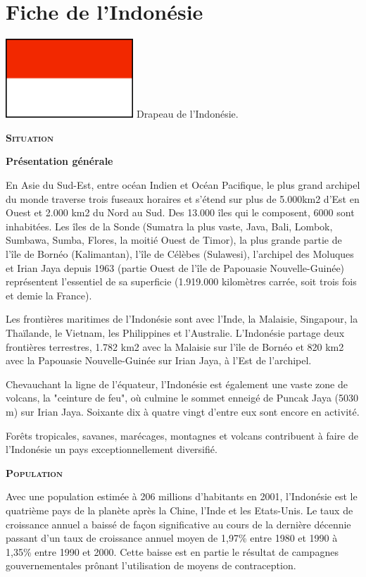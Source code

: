 \section{Fiche de l'Indonésie}

\hspace*{-0.65cm}
\includegraphics[width=4.8cm]{articles/Fiche-de-l-indonesie/drapeauindonesie.png}
Drapeau de l'Indonésie.

\textbf{\textsc{Situation}}

\textbf{Présentation générale}

En Asie du Sud-Est, entre océan Indien et Océan Pacifique, le plus grand archipel du monde traverse trois fuseaux horaires et s'étend sur plus de 5.000km2 d'Est en Ouest et 2.000 km2 du Nord au Sud. Des 13.000 îles qui le composent, 6000 sont inhabitées. Les îles de la Sonde (Sumatra la plus vaste, Java, Bali, Lombok, Sumbawa, Sumba, Flores, la moitié Ouest de Timor), la plus grande partie de l'île de Bornéo (Kalimantan), l'île de Célèbes (Sulawesi), l'archipel des Moluques et Irian Jaya depuis 1963 (partie Ouest de l'île de Papouasie Nouvelle-Guinée) représentent l'essentiel de sa superficie (1.919.000 kilomètres carrée, soit trois fois et demie la France).

Les frontières maritimes de l'Indonésie sont avec l'Inde, la Malaisie, Singapour, la Thaïlande, le Vietnam, les Philippines et l'Australie. L'Indonésie partage deux frontières terrestres, 1.782 km2 avec la Malaisie sur l'île de Bornéo et 820 km2 avec la Papouasie Nouvelle-Guinée sur Irian Jaya, à l'Est de l'archipel.

Chevauchant la ligne de l'équateur, l'Indonésie est également une vaste zone de volcans, la "ceinture de feu", où culmine le sommet enneigé de Puncak Jaya (5030 m) sur Irian Jaya. Soixante dix à quatre vingt d'entre eux sont encore en activité.

Forêts tropicales, savanes, marécages, montagnes et volcans contribuent à faire de l'Indonésie un pays exceptionnellement diversifié.

\textbf{\textsc{Population}}

Avec une population estimée à 206 millions d'habitants en 2001, l'Indonésie est le quatrième pays de la planète après la Chine, l'Inde et les Etats-Unis. Le taux de croissance annuel a baissé de façon significative au cours de la dernière décennie passant d'un taux de croissance annuel moyen de 1,97\% entre 1980 et 1990 à 1,35\% entre 1990 et 2000. Cette baisse est en partie le résultat de campagnes gouvernementales prônant l'utilisation de moyens de contraception.

